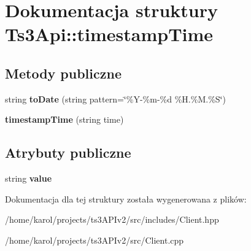 \hypertarget{struct_ts3_api_1_1timestamp_time}{}\section{Dokumentacja struktury Ts3\+Api\+:\+:timestamp\+Time}
\label{struct_ts3_api_1_1timestamp_time}
\subsection*{Metody publiczne}
\begin{DoxyCompactItemize}
\item 
string {\bfseries to\+Date} (string pattern=\char`\"{}\%Y-\/\%m-\/\%d \%H.\%M.\%S\char`\"{})\hypertarget{struct_ts3_api_1_1timestamp_time_a39b2ad782e579670bad4888682cab8af}{}\label{struct_ts3_api_1_1timestamp_time_a39b2ad782e579670bad4888682cab8af}

\item 
{\bfseries timestamp\+Time} (string time)\hypertarget{struct_ts3_api_1_1timestamp_time_a6edd44d64e57b0c27a02701b90054cd4}{}\label{struct_ts3_api_1_1timestamp_time_a6edd44d64e57b0c27a02701b90054cd4}

\end{DoxyCompactItemize}
\subsection*{Atrybuty publiczne}
\begin{DoxyCompactItemize}
\item 
string {\bfseries value}\hypertarget{struct_ts3_api_1_1timestamp_time_a12c07c856dd422e610aeedb4048532b4}{}\label{struct_ts3_api_1_1timestamp_time_a12c07c856dd422e610aeedb4048532b4}

\end{DoxyCompactItemize}


Dokumentacja dla tej struktury została wygenerowana z plików\+:\begin{DoxyCompactItemize}
\item 
/home/karol/projects/ts3\+A\+P\+Iv2/src/includes/Client.\+hpp\item 
/home/karol/projects/ts3\+A\+P\+Iv2/src/Client.\+cpp\end{DoxyCompactItemize}
